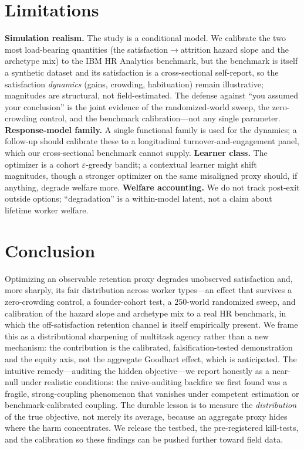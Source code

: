 \documentclass[11pt]{article}
\begin{document}
\section{Limitations}
\textbf{Simulation realism.} The study is a conditional model. We calibrate the
two most load-bearing quantities (the satisfaction$\to$attrition hazard slope and
the archetype mix) to the IBM HR Analytics benchmark, but the benchmark is itself
a synthetic dataset and its satisfaction is a cross-sectional self-report, so the
satisfaction \emph{dynamics} (gains, crowding, habituation) remain illustrative;
magnitudes are structural, not field-estimated. The defense against ``you assumed
your conclusion'' is the joint evidence of the randomized-world sweep, the
zero-crowding control, and the benchmark calibration---not any single parameter.
\textbf{Response-model family.} A single functional family is used for the
dynamics; a follow-up should calibrate these to a longitudinal
turnover-and-engagement panel, which our cross-sectional benchmark cannot supply.
\textbf{Learner class.} The optimizer is a
cohort $\varepsilon$-greedy bandit; a contextual learner might shift magnitudes,
though a stronger optimizer on the same misaligned proxy should, if anything,
degrade welfare more. \textbf{Welfare accounting.} We do not track post-exit
outside options; ``degradation'' is a within-model latent, not a claim about
lifetime worker welfare.

\section{Conclusion}
Optimizing an observable retention proxy degrades unobserved satisfaction and,
more sharply, its fair distribution across worker types---an effect that survives
a zero-crowding control, a founder-cohort test, a $250$-world randomized sweep,
and calibration of the hazard slope and archetype mix to a real HR benchmark, in
which the off-satisfaction retention channel is itself empirically present. We
frame this as a distributional sharpening of multitask agency rather than a new
mechanism: the contribution is the calibrated, falsification-tested demonstration
and the equity axis, not the aggregate Goodhart effect, which is anticipated. The
intuitive remedy---auditing the hidden objective---we report honestly as a
near-null under realistic conditions: the naive-auditing backfire we first found
was a fragile, strong-coupling phenomenon that vanishes under competent estimation
or benchmark-calibrated coupling. The durable lesson is to measure the
\emph{distribution} of the true objective, not merely its average, because an
aggregate proxy hides where the harm concentrates. We release the testbed, the
pre-registered kill-tests, and the calibration so these findings can be pushed
further toward field data.
\end{document}
